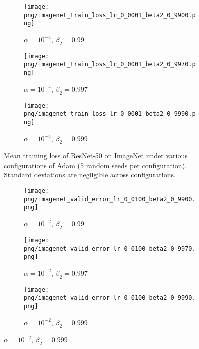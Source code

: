 {\begin{figure}[!th]
\begin{subfigure}[b]{0.33\linewidth}
\captionsetup{
  justification=centering,
  margin=0.1in,
  size=normalsize
}
\texttt{[image: png/imagenet\_train\_loss\_lr\_0\_0001\_beta2\_0\_9900.png]}
\caption{$\alpha = {10}^{-4}$, $\beta_2 = 0.99$}
\end{subfigure}
\begin{subfigure}[b]{0.33\linewidth}
\captionsetup{
  justification=centering,
  margin=0.1in,
  size=normalsize
}
\texttt{[image: png/imagenet\_train\_loss\_lr\_0\_0001\_beta2\_0\_9970.png]}
\caption{$\alpha = {10}^{-4}$, $\beta_2 = 0.997$}
\end{subfigure}
\begin{subfigure}[b]{0.33\linewidth}
\captionsetup{
  justification=centering,
  margin=0.1in,
  size=normalsize
}
\texttt{[image: png/imagenet\_train\_loss\_lr\_0\_0001\_beta2\_0\_9990.png]}
\caption{$\alpha = {10}^{-4}$, $\beta_2 = 0.999$}
\end{subfigure}

\caption{Mean training loss of ResNet-50 on ImageNet under various configurations of Adam (5 random seeds per configuration). Standard deviations are negligible across configurations.}
  
\label{fig:imagenet-train-loss-full}\end{figure}
\begin{figure}[!th]
\centering

\captionsetup{
  justification=centering,
  margin=0.1in,
  size=normalsize
}

\begin{subfigure}[b]{0.33\linewidth}
\captionsetup{
  justification=centering,
  margin=0.1in,
  size=normalsize
}
\texttt{[image: png/imagenet\_valid\_error\_lr\_0\_0100\_beta2\_0\_9900.png]}
\caption{$\alpha = {10}^{-2}$, $\beta_2 = 0.99$}
\end{subfigure}
\begin{subfigure}[b]{0.33\linewidth}
\captionsetup{
  justification=centering,
  margin=0.1in,
  size=normalsize
}
\texttt{[image: png/imagenet\_valid\_error\_lr\_0\_0100\_beta2\_0\_9970.png]}
\caption{$\alpha = {10}^{-2}$, $\beta_2 = 0.997$}
\end{subfigure}
\begin{subfigure}[b]{0.33\linewidth}
\captionsetup{
  justification=centering,
  margin=0.1in,
  size=normalsize
}
\texttt{[image: png/imagenet\_valid\_error\_lr\_0\_0100\_beta2\_0\_9990.png]}
\caption{$\alpha = {10}^{-2}$, $\beta_2 = 0.999$}
\end{subfigure}


\end{figure}}
